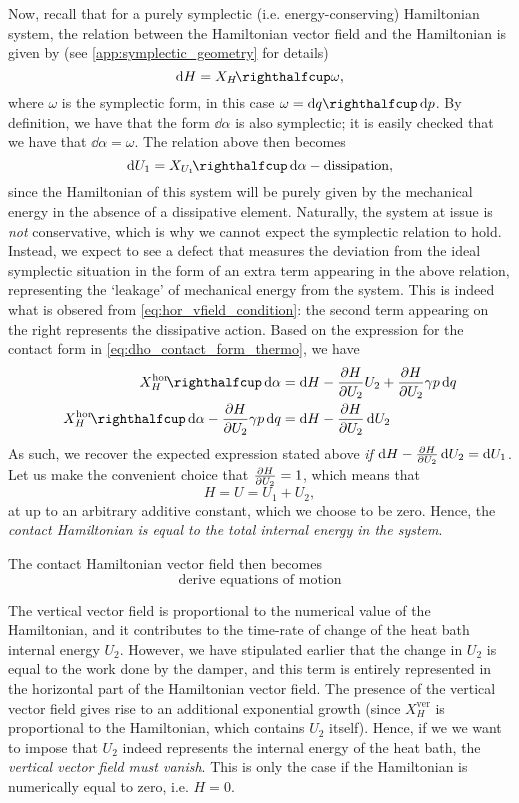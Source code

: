 Now, recall that for a purely symplectic (i.e. energy-conserving) Hamiltonian system, the relation between the Hamiltonian vector field and the Hamiltonian is given by (see \cref{app:symplectic_geometry} for details) 
$$ \dd{H} = \intpr{X_H}{\omega}, $$
where $\omega$ is the symplectic form, in this case $\omega = \intpr{\dd{q}}{\dd{p}}$. By definition, we have that the form $\dd{\alpha}$ is also symplectic; it is easily checked that we have that $\dd{\alpha} = \omega$. The relation above then becomes 
$$ \dd{U_1} = \intpr{X_{U_1}}{\dd{\alpha}} - \text{dissipation}, $$
since the Hamiltonian of this system will be purely given by the mechanical energy in the absence of a dissipative element. Naturally, the system at issue is \emph{not} conservative, which is why we cannot expect the symplectic relation to hold. Instead, we expect to see a defect that measures the deviation from the ideal symplectic situation in the form of an extra term appearing in the above relation, representing the `leakage' of mechanical energy from the system. This is indeed what is obsered from \cref{eq:hor_vfield_condition}: the second term appearing on the right represents the dissipative action. Based on the expression for the contact form in \cref{eq:dho_contact_form_thermo}, we have
\begin{equation} 
    \begin{split}
        \intpr{X_H^\text{hor}}{\dd{\alpha}} &= \dd{H}  - \pdv{H}{U_2}U_2 + \pdv{H}{U_2}\gamma p\dd{q} \\
        \intpr{X_H^\text{hor}}{\dd{\alpha}} - \pdv{H}{U_2}\gamma p\dd{q} &= \dd{H}  - \pdv{H}{U_2}\dd{U_2}
    \end{split}
\end{equation}
As such, we recover the expected expression stated above \emph{if} $\dd{H} - \pdv{H}{U_2}\dd{U_2} = \dd{U_1}$. Let us make the convenient choice that $\pdv{H}{U_2} = 1$, which means that 
$$ H = U = U_1 + U_2, $$
at up to an arbitrary additive constant, which we choose to be zero. Hence, the \emph{contact Hamiltonian is equal to the total internal energy in the system}.

The contact Hamiltonian vector field then becomes  
$$ \text{derive equations of motion} $$

The vertical vector field is proportional to the numerical value of the Hamiltonian, and it contributes to the time-rate of change of the heat bath internal energy $U_2$. However, we have stipulated earlier that the change in $U_2$ is equal to the work done by the damper, and this term is entirely represented in the horizontal part of the Hamiltonian vector field. The presence of the vertical vector field gives rise to an additional exponential growth (since $X_H^\text{ver}$ is proportional to the Hamiltonian, which contains $U_2$ itself). Hence, if we we want to impose that $U_2$ indeed represents the internal energy of the heat bath, the \emph{vertical vector field must vanish}. This is only the case if the Hamiltonian is numerically equal to zero, i.e. $H = 0$.

